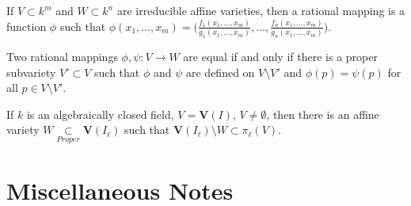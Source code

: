 \documentclass[crop=false,class=book,oneside]{standalone}
\begin{document}
                \begin{definition}
                    If $V\subset k^m$ and $W\subset k^n$ are irreducible
                    affine varieties, then a rational mapping is a
                    function $\phi$ such that
                    $\phi(x_1,\hdots, x_m)%
                     =\bigg(%
                          \frac{f_1(x_1,\hdots, x_m)}%
                               {g_1(x_1,\hdots, x_m)},%
                          \hdots,%
                          \frac{f_n(x_1,\hdots, x_m)}%
                               {g_n(x_1,\hdots, x_m)}%
                      \bigg)$.
                \end{definition}
                \begin{theorem}
                    Two rational mappings $\phi,\psi:V\rightarrow W$
                    are equal if and only if there is a proper subvariety
                    $V'\subset V$ such that $\phi$ and $\psi$ are
                    defined on $V\setminus V'$ and $\phi(p)=\psi(p)$ for
                    all $p\in{V}\setminus{V'}$.
                \end{theorem}
                \begin{theorem}
                    If $k$ is an algebraically closed field,
                    $V=\mathbf{V}(I)$, $V\ne\emptyset$, then there
                    is an affine variety
                    $W\underset{Proper}\subset\mathbf{V}(I_{\ell})$
                    such that
                    $\mathbf{V}(I_{\ell})\setminus%
                     W\subset\pi_{\ell}(V)$.
                \end{theorem}
    \section{Miscellaneous Notes}
\end{document}
